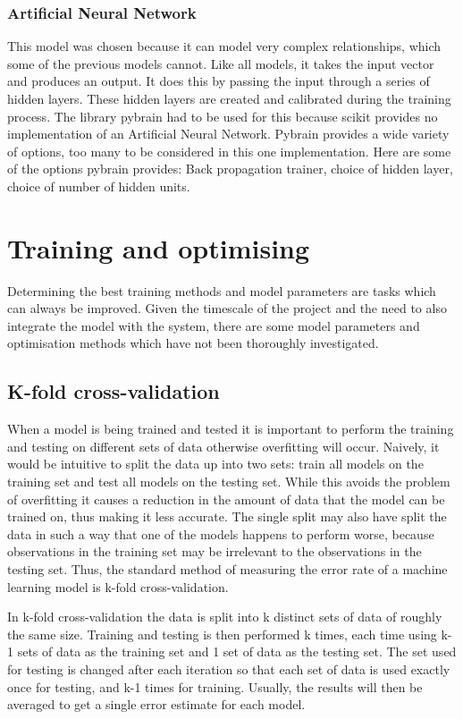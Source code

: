 \subsubsection{Artificial Neural Network}
This model was chosen because it can model very complex relationships, which some of the previous models cannot. Like all models, it takes the input vector and produces an output. It does this by passing the input through a series of hidden layers. These hidden layers are created and calibrated during the training process. The library pybrain had to be used for this because scikit provides no implementation of an Artificial Neural Network.
Pybrain provides a wide variety of options, too many to be considered in this one implementation. Here are some of the options pybrain provides: Back propagation trainer, choice of hidden layer, choice of number of hidden units.

\section{Training and optimising}
Determining the best training methods and model parameters are tasks which can always be improved. Given the timescale of the project and the need to also integrate the model with the system, there are some model parameters and optimisation methods which have not been thoroughly investigated.

\subsection{K-fold cross-validation}
When a model is being trained and tested it is important to perform the training and testing on different sets of data otherwise overfitting will occur. Naively, it would be intuitive to split the data up into two sets: train all models on the training set and test all models on the testing set. While this avoids the problem of overfitting it causes a reduction in the amount of data that the model can be trained on, thus making it less accurate. The single split may also have split the data in such a way that one of the models happens to perform worse, because observations in the training set may be irrelevant to the observations in the testing set. Thus, the standard method of measuring the error rate of a machine learning model is k-fold cross-validation\cite{witten2011data}.

In k-fold cross-validation the data is split into k distinct sets of data of roughly the same size. Training and testing is then performed k times, each time using k-1 sets of data as the training set and 1 set of data as the testing set. The set used for testing is changed after each iteration so that each set of data is used exactly once for testing, and k-1 times for training. Usually, the results will then be averaged to get a single error estimate for each model.

